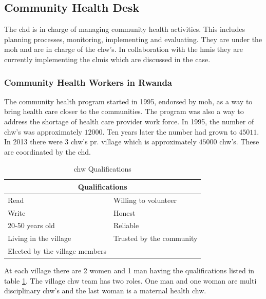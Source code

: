 \subsection{Community Health Desk}
The \gls{chd} is in charge of managing community health activities. 
This includes planning processes, monitoring, implementing and evaluating.
They are under the \gls{moh} and are in charge of the \gls{chw}'s.
In collaboration with the \gls{hmis} they are currently implementing the \gls{clmis} which are discussed in the case.
\cite{chd:strategy}


\subsubsection{Community Health Workers in Rwanda}
The community health program started in 1995, endorsed by \gls{moh}, as a way to bring health care closer to the communities. The program was also a way to address the shortage of health care provider work force. In 1995, the number of \gls{chw}'s was approximately $12000$. Ten years later the number had grown to $45011$. In 2013 there were 3 \gls{chw}'s pr. village which is approximately $45000$ \gls{chw}'s. These are coordinated by the \gls{chd}. 

\begin{table}
\centering
\begin{tabular}{|l l|}
\hline
\multicolumn{2}{|c|}{\textbf{Qualifications}} \\
\hline
Read & Willing to volunteer \\
Write & Honest \\
20-50 years old & Reliable \\
Living in the village & Trusted by the community \\
Elected by the village members & \\
\hline
\end{tabular}
\caption{\gls{chw} Qualifications}
\label{table:chdqualifications}
\end{table}

At each village there are 2 women and 1 man having the qualifications listed in table \ref{table:chdqualifications}. The village \gls{chw} team has two roles. One man and one woman are multi disciplinary \gls{chw}'s and the last woman is a maternal health \gls{chw}.



